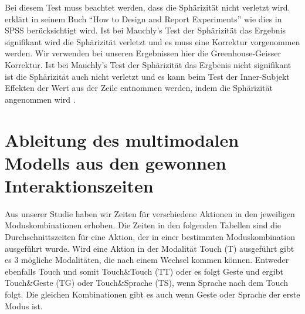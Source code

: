 Bei diesem Test muss beachtet werden, dass die Sphärizität nicht verletzt wird. \citet{field2002design} erklärt in seinem Buch "`How to Design and Report Experiments"' wie dies in SPSS berücksichtigt wird. Ist bei Mauchly's Test der Sphärizität das Ergebnis signifikant wird die Sphärizität verletzt und es muss eine Korrektur vorgenommen werden. Wir verwenden bei unseren Ergebnissen hier die Greenhouse-Geisser Korrektur. Ist bei Mauchly's Test der Sphärizität das Ergbenis nicht signifikant ist die Sphärizität auch nicht verletzt und es kann beim Test der Inner-Subjekt Effekten der Wert aus der Zeile entnommen werden, indem die Sphärizität angenommen wird \citep{field2002design}.

\section[Herleitung des Modells]{Ableitung des multimodalen Modells aus den gewonnen Interaktionszeiten}
Aus unserer Studie haben wir Zeiten für verschiedene Aktionen in den jeweiligen Moduskombinationen erhoben. Die Zeiten in den folgenden Tabellen sind die Durchschnittszeiten für eine Aktion, der in einer bestimmten Moduskombination ausgeführt wurde. Wird eine Aktion in der Modalität Touch (T) ausgeführt gibt es 3 mögliche Modalitäten, die nach einem Wechsel kommen können. Entweder ebenfalls Touch und somit Touch\&Touch (TT) oder es folgt Geste und ergibt Touch\&Geste (TG) oder Touch\&Sprache (TS), wenn Sprache nach dem Touch folgt. Die gleichen Kombinationen gibt es auch wenn Geste oder Sprache der erste Modus ist. 

